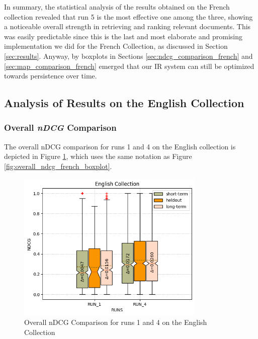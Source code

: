 In summary, the statistical analysis of the results obtained on the French collection revealed that run 5 is the most effective one among the three, showing a noticeable overall strength in retrieving and ranking relevant documents.
This was easily predictable since this is the last and most elaborate and promising implementation we did for the French Collection, as discussed in Section \ref{sec:results}.
Anyway, by boxplots in Sections \ref{sec:ndcg_comparison_french} and \ref{sec:map_comparison_french} emerged that our \ac{IR} system can still be optimized towards persistence over time.



\subsection{Analysis of Results on the English Collection}

\subsubsection{Overall \textit{nDCG} Comparison} \label{sec:ndcg_comparison_eng}

The overall \ac{nDCG} comparison for runs 1 and 4 on the English collection is depicted in Figure \ref{fig:overall_ndcg_eng}, which uses the same notation as Figure \ref{fig:overall_ndcg_french_boxplot}.

\begin{figure}[!h]
\centering
\includegraphics[width=0.8\textwidth]{figure/StatisticalAnalysis/BoxPlot/NDGC ENGLISH.png}
\caption{Overall nDCG Comparison for runs 1 and 4 on the English Collection}
\label{fig:overall_ndcg_eng}
\end{figure}

